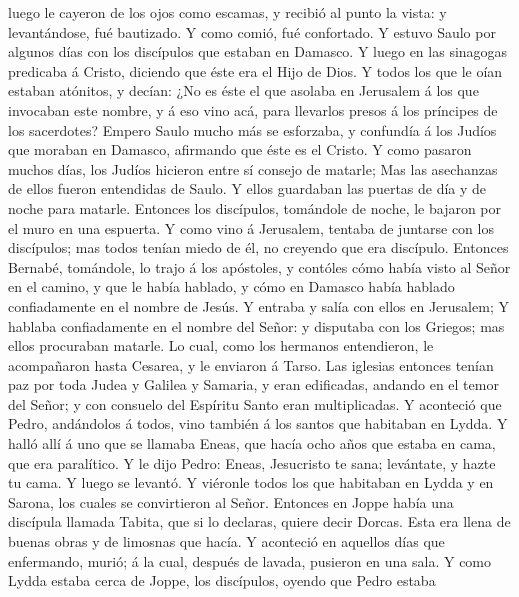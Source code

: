 luego le cayeron de los ojos como escamas, y recibió al punto la vista:
y levantándose, fué bautizado.  Y como comió, fué
confortado. Y estuvo Saulo por algunos días con los discípulos que
estaban en Damasco.  Y luego en las sinagogas predicaba á
Cristo, diciendo que éste era el Hijo de Dios.  Y todos
los que le oían estaban atónitos, y decían: ¿No es éste el que asolaba
en Jerusalem á los que invocaban este nombre, y á eso vino acá, para
llevarlos presos á los príncipes de los sacerdotes? 
Empero Saulo mucho más se esforzaba, y confundía á los Judíos que
moraban en Damasco, afirmando que éste es el Cristo.  Y
como pasaron muchos días, los Judíos hicieron entre sí consejo de
matarle;  Mas las asechanzas de ellos fueron entendidas
de Saulo. Y ellos guardaban las puertas de día y de noche para matarle.
 Entonces los discípulos, tomándole de noche, le bajaron
por el muro en una espuerta.  Y como vino á Jerusalem,
tentaba de juntarse con los discípulos; mas todos tenían miedo de él, no
creyendo que era discípulo.  Entonces Bernabé, tomándole,
lo trajo á los apóstoles, y contóles cómo había visto al Señor en el
camino, y que le había hablado, y cómo en Damasco había hablado
confiadamente en el nombre de Jesús.  Y entraba y salía
con ellos en Jerusalem;  Y hablaba confiadamente en el
nombre del Señor: y disputaba con los Griegos; mas ellos procuraban
matarle.  Lo cual, como los hermanos entendieron, le
acompañaron hasta Cesarea, y le enviaron á Tarso.  Las
iglesias entonces tenían paz por toda Judea y Galilea y Samaria, y eran
edificadas, andando en el temor del Señor; y con consuelo del Espíritu
Santo eran multiplicadas.  Y aconteció que Pedro,
andándolos á todos, vino también á los santos que habitaban en Lydda.
 Y halló allí á uno que se llamaba Eneas, que hacía ocho
años que estaba en cama, que era paralítico.  Y le dijo
Pedro: Eneas, Jesucristo te sana; levántate, y hazte tu cama. Y luego se
levantó.  Y viéronle todos los que habitaban en Lydda y
en Sarona, los cuales se convirtieron al Señor.  Entonces
en Joppe había una discípula llamada Tabita, que si lo declaras, quiere
decir Dorcas. Esta era llena de buenas obras y de limosnas que hacía.
 Y aconteció en aquellos días que enfermando, murió; á la
cual, después de lavada, pusieron en una sala.  Y como
Lydda estaba cerca de Joppe, los discípulos, oyendo que Pedro estaba
